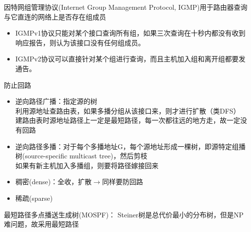 因特网组管理协议(Internet Group Management Protocol, IGMP)用于路由器查询与它直连的网络上是否存在组成员
\begin{itemize}
	\item IGMPv1协议只能对某个接口查询所有组，如果三次查询在十秒内都没有收到响应报告，则认为该接口没有任何组成员。
	\item IGMPv2协议可以直接针对某个组进行查询，而且主机加入组和离开组都要发通告。
\end{itemize}

防止回路
\begin{itemize}
\item 逆向路径广播：指定源的树\\
利用源地址查路由表，如果多播分组从该接口来，则才进行扩散（类DFS）\\
建路由表时源地址路径上一定是最短路径，每一次都往远的地方走，故一定没有回路
\item 逆向路径多播：对于每个多播地址G，每个源地址形成一棵树，即源特定组播树(source-specific multicast tree)，然后剪枝\\
如果有新主机加入多播组，则要将路径嫁接回来
\end{itemize}

\begin{itemize}
	\item 稠密(dense)：全收，扩散$\to$同样要防回路
	\item 稀疏(sparse)
\end{itemize}

最短路径多点播送生成树(MOSPF)：
Steiner树是总代价最小的分布树，但是NP难问题，故采用最短路径

